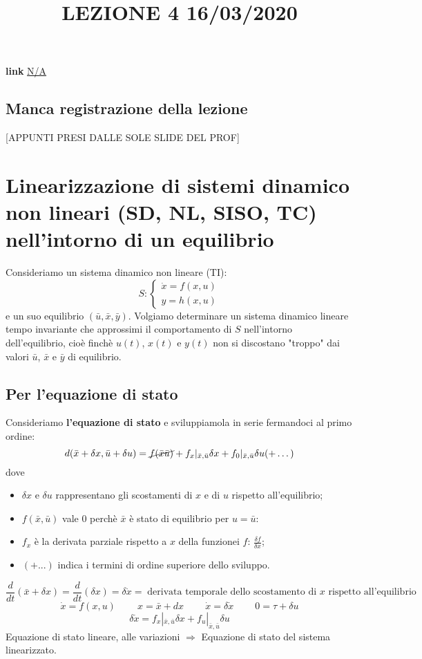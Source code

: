 \title{LEZIONE 4 16/03/2020}\newline
\textbf{link} \href{}{N/A}
\subsection*{Manca registrazione della lezione}
[APPUNTI PRESI DALLE SOLE SLIDE DEL PROF]
\section{Linearizzazione di sistemi dinamico non lineari (SD, NL, SISO, TC) nell'intorno di un equilibrio}
Consideriamo un sistema dinamico non lineare (TI):
\[
    S: \begin{cases}
        \dot{x} = f(x,u)\\
        y = h(x,u)
    \end{cases}
\]
e un suo equilibrio $(\bar{u}, \bar{x}, \bar{y})$.\newline
\newline
Volgiamo determinare un sistema dinamico lineare tempo invariante che approssimi il comportamento di $S$ nell'intorno dell'equilibrio, cioè finchè $u(t)$, $x(t)$ e $y(t)$ non si discostano "troppo" dai valori $\bar{u}$, $\bar{x}$ e $\bar{y}$ di equilibrio.
\subsection{Per l'equazione di stato}
Consideriamo \textbf{l'equazione di stato} e sviluppiamola in serie fermandoci al primo ordine:
\[
    d(\bar{x} + \delta x, \bar{u} + \delta u) = \cancel{ f(\bar{x} \bar{u})} + f_x|_{\bar{x}, \bar{u}}\delta x + f_0|_{\bar{x}, \bar{u}} \delta u (+ \dots)
\]
dove
\begin{itemize}
    \item $\delta x$ e $\delta u$ rappresentano gli scostamenti di $x$ e di $u$ rispetto all'equilibrio;
    \item $f(\bar{x}, \bar{u})$ vale $0$ perchè $\bar{x}$ è stato di equilibrio per $u = \bar{u}$:
    \item $f_x$ è la derivata parziale rispetto a $x$ della funzionei $f$: $\frac{\delta f}{\delta x}$;
    \item $(+ ...)$ indica i termini di ordine superiore dello sviluppo.
\end{itemize}
\[
    \frac{d}{dt} (\bar{x} + \delta x) = \frac{d}{dt} (\delta x) = \delta \dot{x} = \; \text{derivata temporale dello scostamento di $x$ rispetto all'equilibrio}\;
\]
\[
    \dot{x} = f(x,u) \;\;\;\;\;\;\;\; x = \bar{x} + dx \;\;\;\;\;\;\;\; \dot{x} = \delta \dot{x} \;\;\;\;\;\;\;\; 0 = \tau + \delta u
\]
\[
    \delta \dot{x} = f_x|_{\bar{x}, \bar{u}} \delta x + f_u |_{\bar{x}, \bar{u}} \delta u
\]
Equazione di stato lineare, alle variazioni $\Longrightarrow$ Equazione di stato del sistema linearizzato.
